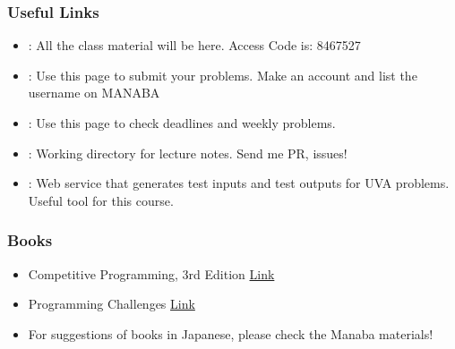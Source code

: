 \documentclass{beamer}
\begin{document}
\begin{frame}
  \frametitle{Useful Links}
  \begin{itemize} 
  \item
    \href{https://manaba.tsukuba.ac.jp/ct/course_781339}
         {}: All the class material
         will be here. Access Code is: 8467527

    \medskip

  \item \href{https://uva.onlinejudge.org/}{}:
    Use this page to submit your problems. \alert{Make an account and list the username on MANABA}

    \medskip

  \item \href{https://conclave.cs.tsukuba.ac.jp/lecture/monitor.html}{}:
    Use this page to check deadlines and weekly problems.

    \medskip

  \item
    \href{https://www.github.com/caranha/ProgrammingChallengesLectureNotes}{}:
    Working directory for lecture notes. Send me PR, issues!

    \medskip
    
  \item
    \href{https://www.udebug.com/}{}:
    Web service that generates test inputs and test outputs for UVA
    problems. Useful tool for this course.
  \end{itemize}
\end{frame}


\begin{frame}
  \frametitle{Books}

  \begin{itemize}
  \item {} Competitive Programming, 3rd Edition
    \href{http://cpbook.net/}{Link}
    
    \bigskip

  \item {} Programming Challenges
    \href{https://books.google.co.jp/books/about/Programming_Challenges.html?id=dNoLBwAAQBAJ&source=kp_cover&redir_esc=y}{Link}

    \bigskip
    
  \item For suggestions of books in Japanese, please check the Manaba materials!
  \end{itemize}
\end{frame}
\end{document}
